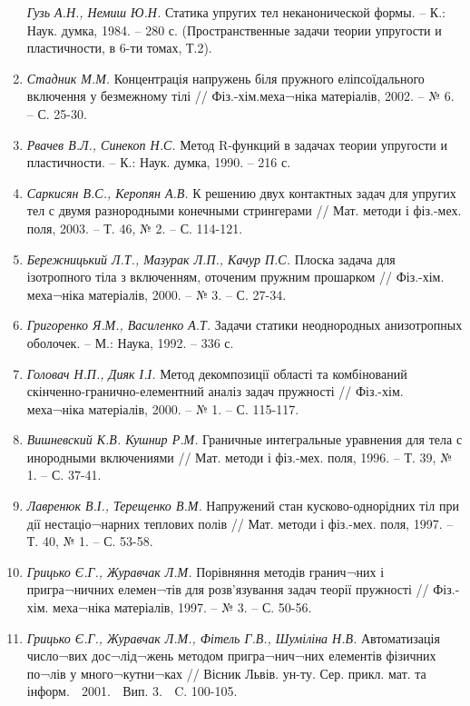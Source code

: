 \begin{enumerate}
  \emph{Гузь А.Н., Немиш Ю.Н.} Статика упругих тел неканонической формы.
  -- К.: Наук. думка, 1984. -- 280 с. (Пространственные задачи теории
  упругости и пластичности, в 6-ти томах, Т.2).
\item
  \emph{Стадник М.М.} Концентрація напружень біля пружного
  еліпсоїдального включення у безмежному тілі // Фіз.-хім.меха¬ніка
  матеріалів, 2002. -- № 6. -- С. 25-30.
\item
  \emph{Рвачев В.Л., Синекоп Н.С.} Метод R-функций в задачах теории
  упругости и пластичности. -- К.: Наук. думка, 1990. -- 216 с.
\item
  \emph{Саркисян В.С., Керопян А.В.} К решению двух контактных задач для
  упругих тел с двумя разнородными конечными стрингерами // Мат. методи
  і фіз.-мех. поля, 2003. -- Т. 46, № 2. -- С. 114-121.
\item
  \emph{Бережницький Л.Т., Мазурак Л.П., Качур П.С.} Плоска задача для
  ізотропного тіла з включенням, оточеним пружним прошарком // Фіз.-хім.
  меха¬ніка матеріалів, 2000. -- № 3. -- С. 27-34.
\item
  \emph{Григоренко Я.М., Василенко А.Т.} Задачи статики неоднородных
  анизотропных оболочек. -- М.: Наука, 1992. -- 336 с.
\item
  \emph{Головач Н.П., Дияк І.І.} Метод декомпозиції області та
  комбінований скінченно-гранично-елементний аналіз задач пружності //
  Фіз.-хім. меха¬ніка матеріалів, 2000. -- № 1. -- С. 115-117.
\item
  \emph{Вишневский К.В. Кушнир Р.М.} Граничные интегральные уравнения
  для тела с инородными включениями // Мат. методи і фіз.-мех. поля,
  1996. -- Т. 39, № 1. -- С. 37-41.
\item
  \emph{Лавренюк В.І., Терещенко В.М.} Напружений стан
  кусково-однорідних тіл при дії нестаціо¬нарних теплових полів // Мат.
  методи і фіз.-мех. поля, 1997. -- Т. 40, № 1. -- С. 53-58.
\item
  \emph{Грицько Є.Г., Журавчак Л.М.} Порівняння методів гранич¬них і
  пригра¬ничних елемен¬тів для розв'язування задач теорії пружності //
  Фіз.-хім. меха¬ніка матеріалів, 1997. -- № 3. -- С. 50-56.
\item
  \emph{Грицько Є.Г., Журавчак Л.М., Фітель Г.В., Шуміліна Н.В.}
  Автоматизація число¬вих дос¬лід¬жень методом пригра¬нич¬них елементів
  фізичних по¬лів у много¬кутни¬ках // Вісник Львів. ун-ту. Сер. прикл.
  мат. та інформ.  2001.  Вип. 3.  C. 100-105.
\end{enumerate}
